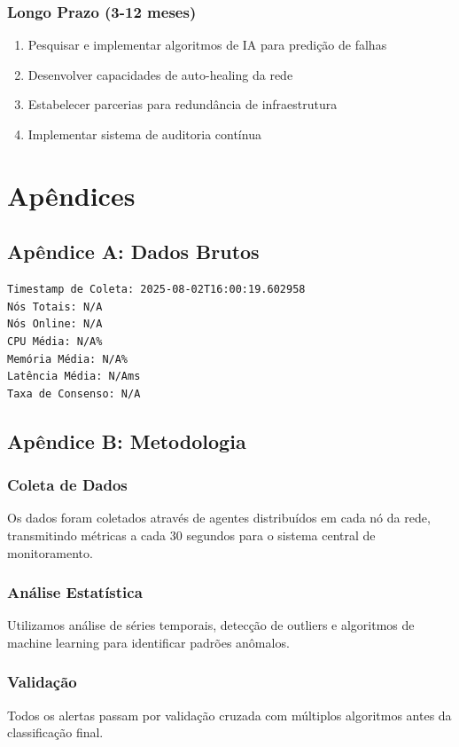 \documentclass[12pt,a4paper]{report}
\begin{document}
\subsection{Longo Prazo (3-12 meses)}
\begin{enumerate}
\item Pesquisar e implementar algoritmos de IA para predição de falhas
\item Desenvolver capacidades de auto-healing da rede
\item Estabelecer parcerias para redundância de infraestrutura
\item Implementar sistema de auditoria contínua
\end{enumerate}


\chapter{Apêndices}


\section{Apêndice A: Dados Brutos}


\begin{verbatim}
Timestamp de Coleta: 2025-08-02T16:00:19.602958
Nós Totais: N/A
Nós Online: N/A
CPU Média: N/A%
Memória Média: N/A%
Latência Média: N/Ams
Taxa de Consenso: N/A
\end{verbatim}


\section{Apêndice B: Metodologia}

\subsection{Coleta de Dados}
Os dados foram coletados através de agentes distribuídos em cada nó da rede, 
transmitindo métricas a cada 30 segundos para o sistema central de monitoramento.

\subsection{Análise Estatística}
Utilizamos análise de séries temporais, detecção de outliers e algoritmos de 
machine learning para identificar padrões anômalos.

\subsection{Validação}
Todos os alertas passam por validação cruzada com múltiplos algoritmos antes 
da classificação final.
\end{document}

